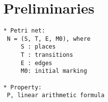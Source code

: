 \section{Preliminaries}


\begin{verbatim}
* Petri net:
 N = (S, T, E, M0), where
     S : places
     T : transitions
     E : edges
     M0: initial marking

* Property:
 P, linear arithmetic formula
\end{verbatim}

\iffalse
\begin{verbatim}
 Examples:
  x + y < 0
  x + y < 0 \\and x + z > 0
  x + y < 0 \\or  x + z > 0

 ~P = (x + y <  0 \\and x + z >  0) \\or  x + z >  0
  P = (x + y >= 0 \\or  x + z <= 0) \\and x + z <= 0
\end{verbatim}
\fi